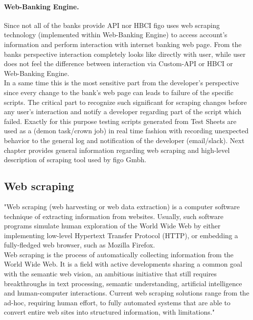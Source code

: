 	\paragraph{Web-Banking Engine.} Since not all of the banks provide API nor HBCI figo uses web scraping technology (implemented within Web-Banking Engine) to access account's information and perform interaction with internet banking web page.
	From the banks perspective interaction completely looks like directly with user, while user does not feel the difference between interaction via Custom-API or HBCI or Web-Banking Engine.\\
	In a same time this is the most sensitive part from the developer's perspective since every change to the bank's web page can leads to failure of the specific scripts. The critical part to recognize such significant for scraping changes before any user's interaction and notify a developer regarding part of the script which failed. Exactly for this purpose testing scripts generated from Test Sheets are used as a (demon task/crown job) in real time fashion with recording unexpected behavior to the general log and notification of the developer (email/slack). Next chapter provides general information regarding web scraping and high-level description of scraping tool used by figo Gmbh.
	

	
	\subsection{Web scraping}
	"Web scraping (web harvesting or web data extraction) is a computer software technique of extracting information from websites. Usually, such software programs simulate human exploration of the World Wide Web by either implementing low-level Hypertext Transfer Protocol (HTTP), or embedding a fully-fledged web browser, such as Mozilla Firefox.\\

Web scraping is the process of automatically collecting information from the World Wide Web. It is a field with active developments sharing a common goal with the semantic web vision, an ambitious initiative that still requires breakthroughs in text processing, semantic understanding, artificial intelligence and human-computer interactions. Current web scraping solutions range from the ad-hoc, requiring human effort, to fully automated systems that are able to convert entire web sites into structured information, with limitations." \cite{wikiScraping}

